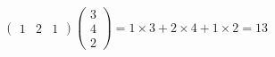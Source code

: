\begin{equation*}
	\begin{pmatrix}
		1 & 2 & 1
	\end{pmatrix}
	\begin{pmatrix}
		3 \\4\\2
	\end{pmatrix}
	=1\times 3 + 2 \times 4 + 1 \times 2 = 13
\end{equation*}

